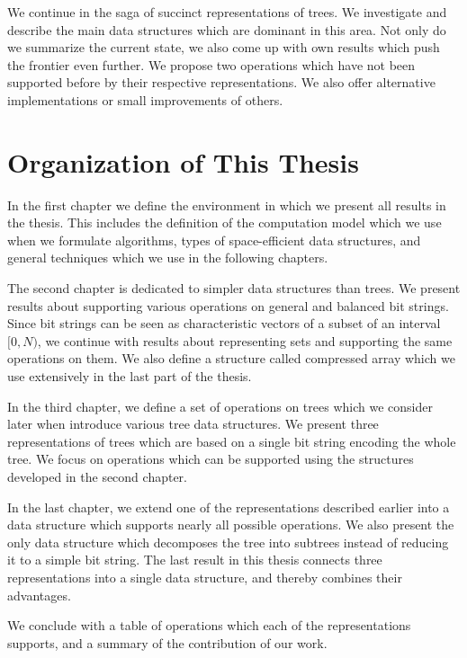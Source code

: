 \bigbreak

We continue in the saga of succinct representations of trees.
We investigate and describe the main data structures which are dominant in this area.
Not only do we summarize the current state, we also come up with own results which push the frontier even further.
We propose two operations which have not been supported before by their respective representations.
We also offer alternative implementations or small improvements of others.

\section*{Organization of This Thesis}

In the first chapter we define the environment in which we present all results in the thesis.
This includes the definition of the computation model which we use when we formulate algorithms, types of space-efficient data structures, and general techniques which we use in the following chapters.

The second chapter is dedicated to simpler data structures than trees.
We present results about supporting various operations on general and balanced bit strings.
Since bit strings can be seen as characteristic vectors of a subset of an interval $[0, N)$, we continue with results about representing sets and supporting the same operations on them.
We also define a structure called compressed array which we use extensively in the last part of the thesis.

In the third chapter, we define a set of operations on trees which we consider later when introduce various tree data structures.
We present three representations of trees which are based on a single bit string encoding the whole tree.
We focus on operations which can be supported using the structures developed in the second chapter.

In the last chapter, we extend one of the representations described earlier into a data structure which supports nearly all possible operations.
We also present the only data structure which decomposes the tree into subtrees instead of reducing it to a simple bit string.
The last result in this thesis connects three representations into a single data structure, and thereby combines their advantages.

We conclude with a table of operations which each of the representations supports, and a summary of the contribution of our work.